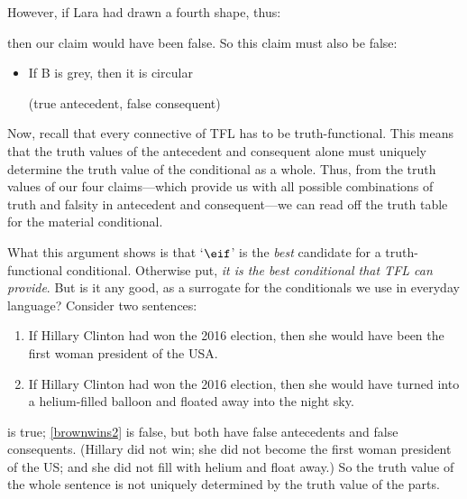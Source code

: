 However, if Lara had drawn a fourth shape, thus:
\begin{center}
\end{center}
then our claim would have been false. So this claim must also be false:
	\begin{itemize}
		\item If B is grey, then it is circular

		\qquad (true antecedent, false consequent)
	\end{itemize}
Now, recall that every connective of TFL has to be truth-functional. This means that the truth values of the antecedent and consequent alone must uniquely determine the truth value of the conditional as a whole. Thus, from the truth values of our four claims---which provide us with all possible combinations of truth and falsity in antecedent and consequent---we can read off the truth table for the material conditional.

What this argument shows is that `$\eif$' is the \emph{best} candidate for a truth-functional conditional. Otherwise put, \emph{it is the best conditional that TFL can provide}. But is it any good, as a surrogate for the conditionals we use in everyday language? Consider two sentences:
	\begin{enumerate}
		\item\label{brownwins1} If Hillary Clinton had won the 2016 election, then she would have been the first woman president of the USA.
		\item\label{brownwins2} If Hillary Clinton had won the 2016 election, then she would have turned into a helium-filled balloon and floated away into the night sky.
	\end{enumerate}
 is true; \cref*{brownwins2} is false, but both have false antecedents and false consequents. (Hillary did not win; she did not become the first woman president of the US; and she did not fill with helium and float away.) So the truth value of the whole sentence is not uniquely determined by the truth value of the parts.

